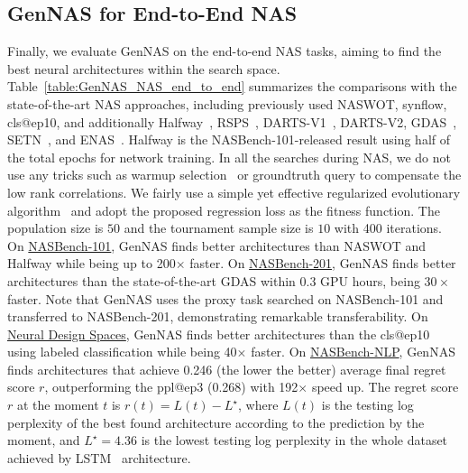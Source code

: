 \documentclass{article}
\begin{document}
\begin{table}[]
\begin{tabular}{lccccccccc}
\bottomrule
\end{tabular}
\vspace{-8pt}
\end{table}


\vspace{-8pt}

\subsection{GenNAS for End-to-End NAS}
\label{sec:exp-nas-search}






Finally, we evaluate GenNAS on the end-to-end NAS tasks, aiming to find the best neural architectures within the search space.
Table~\ref{table:GenNAS_NAS_end_to_end} summarizes the comparisons with the state-of-the-art NAS approaches, including previously used NASWOT, synflow, cls@ep10, and additionally Halfway~\cite{ying2019bench}, RSPS~\cite{li2020random}, DARTS-V1~\cite{liu2018darts}, DARTS-V2, GDAS~\cite{dong2019searching}, SETN~\cite{dong2019one}, and ENAS~\cite{pham2018efficient}.
Halfway is the NASBench-101-released result using half of the total epochs for network training.
In all the searches during NAS, we do not use any tricks such as warmup selection~\cite{abdelfattah2021zero} or groundtruth query to compensate the low rank correlations. 
We fairly use a simple yet effective regularized evolutionary algorithm~\cite{real2019regularized} and adopt the proposed regression loss as the fitness function. 
The population size is $50$ and the tournament sample size is $10$ with 400 iterations.
On \underline{NASBench-101}, GenNAS finds better architectures than NASWOT and Halfway while being up to 200$\times$ faster.
On \underline{NASBench-201}, GenNAS finds better architectures than the state-of-the-art GDAS within 0.3 GPU hours, being $30\times$ faster.
Note that GenNAS uses the proxy task searched on NASBench-101 and transferred to NASBench-201, demonstrating remarkable transferability.
On \underline{Neural Design Spaces}, GenNAS finds better architectures than the cls@ep10 using labeled classification while being 40$\times$ faster.
On \underline{NASBench-NLP}, GenNAS finds architectures that achieve 0.246 (the lower the better) average final regret score $r$, outperforming the ppl@ep3 (0.268) with 192$\times$ speed up. The regret score $r$ at the moment $t$ is $r(t) = L(t)-L^\star$, where $L(t)$ is the testing log perplexity of the best found architecture according to the prediction by the moment, and $L^\star = 4.36$ is the lowest testing log perplexity in the whole dataset achieved by LSTM~\cite{hochreiter1997long} architecture. 
\end{document}
